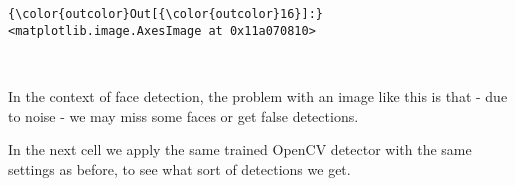 \documentclass[11pt]{article}
\begin{document}
\begin{Verbatim}[commandchars=\\\{\}]
{\color{outcolor}Out[{\color{outcolor}16}]:} <matplotlib.image.AxesImage at 0x11a070810>
\end{Verbatim}
            
    \begin{center}
    \end{center}
    { \hspace*{\fill} \\}
    
    In the context of face detection, the problem with an image like this is
that - due to noise - we may miss some faces or get false detections.

In the next cell we apply the same trained OpenCV detector with the same
settings as before, to see what sort of detections we get.
\end{document}
